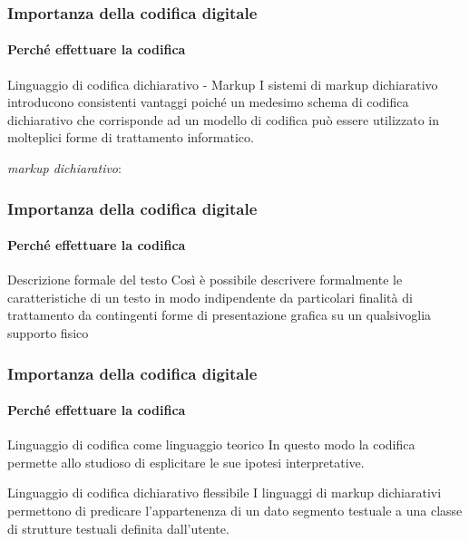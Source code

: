 \begin{frame}
	\frametitle{Importanza della codifica digitale}
	\framesubtitle{Perché effettuare la codifica}
	\addtocounter{nframe}{1}

	\begin{block}{Linguaggio di codifica dichiarativo - Markup}
		I sistemi di markup dichiarativo introducono consistenti vantaggi poiché un medesimo schema di codifica dichiarativo che corrisponde ad un modello di codifica può essere utilizzato in molteplici forme di trattamento informatico.
	\end{block}

	\textit{markup dichiarativo}:

\end{frame}

\begin{frame}
	\frametitle{Importanza della codifica digitale}
	\framesubtitle{Perché effettuare la codifica}
	\addtocounter{nframe}{1}

	\begin{block}{Descrizione formale del testo}
		Così è possibile descrivere formalmente le caratteristiche di un testo in modo indipendente da particolari finalità di trattamento da contingenti forme di presentazione grafica su un qualsivoglia supporto fisico
	\end{block}

\end{frame}


\begin{frame}
	\frametitle{Importanza della codifica digitale}
	\framesubtitle{Perché effettuare la codifica}
	\addtocounter{nframe}{1}

	\begin{block}{Linguaggio di codifica come linguaggio teorico}
		In questo modo la codifica permette allo studioso di esplicitare le sue ipotesi interpretative.
	\end{block}

	\begin{block}{Linguaggio di codifica dichiarativo flessibile}
		I linguaggi di markup dichiarativi permettono di predicare l’appartenenza di un dato segmento testuale a una classe di strutture testuali definita dall’utente.
	\end{block}

\end{frame}

